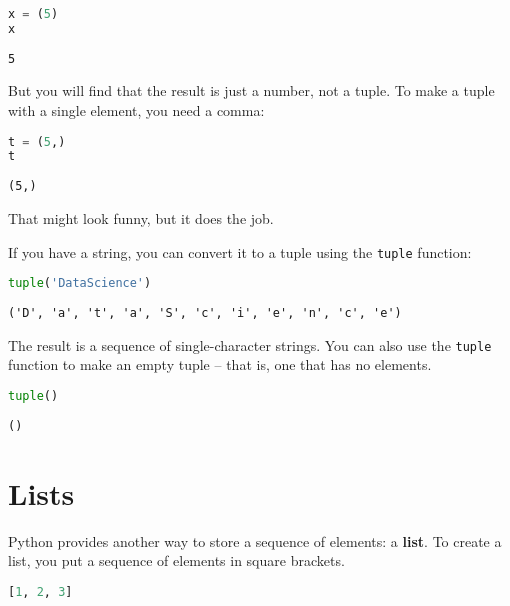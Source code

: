 \begin{lstlisting}[language=Python,style=source]
x = (5)
x
\end{lstlisting}

\begin{lstlisting}[style=output]
5
\end{lstlisting}

But you will find that the result is just a number, not a tuple. To make
a tuple with a single element, you need a comma:

\begin{lstlisting}[language=Python,style=source]
t = (5,)
t
\end{lstlisting}

\begin{lstlisting}[style=output]
(5,)
\end{lstlisting}

That might look funny, but it does the job.

If you have a string, you can convert it to a tuple using the
\passthrough{\lstinline!tuple!} function:

\begin{lstlisting}[language=Python,style=source]
tuple('DataScience')
\end{lstlisting}

\begin{lstlisting}[style=output]
('D', 'a', 't', 'a', 'S', 'c', 'i', 'e', 'n', 'c', 'e')
\end{lstlisting}

The result is a sequence of single-character strings. You can also use
the \passthrough{\lstinline!tuple!} function to make an empty tuple --
that is, one that has no elements.

\begin{lstlisting}[language=Python,style=source]
tuple()
\end{lstlisting}

\begin{lstlisting}[style=output]
()
\end{lstlisting}

\section{Lists}\label{lists}

Python provides another way to store a sequence of elements: a
\textbf{list}. To create a list, you put a sequence of elements in
square brackets.

\begin{lstlisting}[language=Python,style=source]
[1, 2, 3]
\end{lstlisting}


